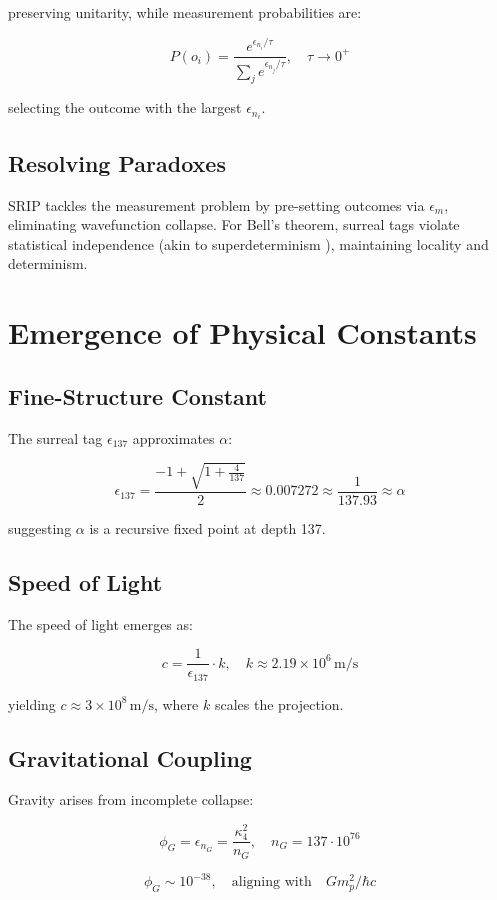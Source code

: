 \documentclass[12pt]{article}
\begin{document}
preserving unitarity, while measurement probabilities are:

\[
P(o_i) = \frac{e^{\epsilon_{n_i} / \tau}}{\sum_j e^{\epsilon_{n_j} / \tau}}, \quad \tau \to 0^+
\]

selecting the outcome with the largest \(\epsilon_{n_i}\).

\subsection{Resolving Paradoxes}
SRIP tackles the measurement problem by pre-setting outcomes via \(\epsilon_m\), eliminating wavefunction collapse. For Bell's theorem, surreal tags violate statistical independence (akin to superdeterminism \cite{Hossenfelder2019}), maintaining locality and determinism.

\section{Emergence of Physical Constants}
\subsection{Fine-Structure Constant}
The surreal tag \(\epsilon_{137}\) approximates \(\alpha\):

\[
\epsilon_{137} = \frac{-1 + \sqrt{1 + \frac{4}{137}}}{2} \approx 0.007272 \approx \frac{1}{137.93} \approx \alpha
\]

suggesting \(\alpha\) is a recursive fixed point at depth 137.

\subsection{Speed of Light}
The speed of light emerges as:

\[
c = \frac{1}{\epsilon_{137}} \cdot k, \quad k \approx 2.19 \times 10^6 \, \text{m/s}
\]

yielding \(c \approx 3 \times 10^8 \, \text{m/s}\), where \(k\) scales the projection.

\subsection{Gravitational Coupling}
Gravity arises from incomplete collapse:

\[
\phi_G = \epsilon_{n_G} = \frac{\kappa_4^2}{n_G}, \quad n_G = 137 \cdot 10^{76}
\]

\[
\phi_G \sim 10^{-38}, \quad \text{aligning with} \quad G m_p^2 / \hbar c
\]
\end{document}
